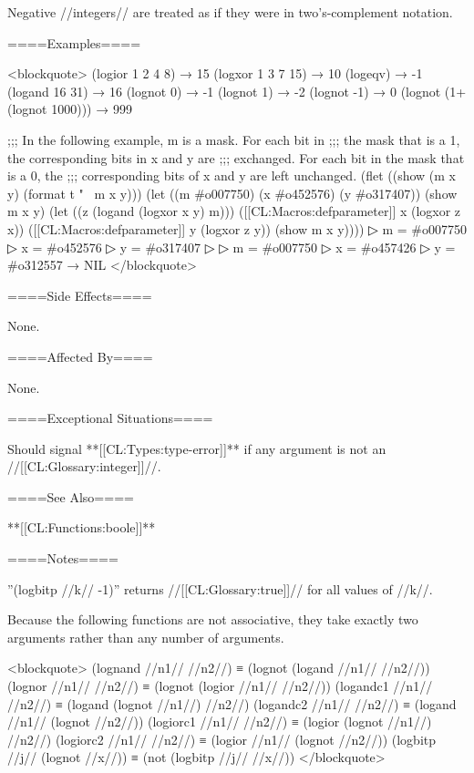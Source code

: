 Negative //integers// are treated as if they were in two's-complement notation.

====Examples====

<blockquote> (logior 1 2 4 8) → 15 (logxor 1 3 7 15) → 10 (logeqv) → -1 (logand 16 31) → 16 (lognot 0) → -1 (lognot 1) → -2 (lognot -1) → 0 (lognot (1+ (lognot 1000))) → 999

;;; In the following example, m is a mask. For each bit in ;;; the mask that is a 1, the corresponding bits in x and y are ;;; exchanged. For each bit in the mask that is a 0, the ;;; corresponding bits of x and y are left unchanged. (flet ((show (m x y) (format t "~ m x y))) (let ((m #o007750) (x #o452576) (y #o317407)) (show m x y) (let ((z (logand (logxor x y) m))) ([[CL:Macros:defparameter]] x (logxor z x)) ([[CL:Macros:defparameter]] y (logxor z y)) (show m x y))))
▷ m = #o007750
▷ x = #o452576
▷ y = #o317407
▷
▷ m = #o007750
▷ x = #o457426
▷ y = #o312557 → NIL </blockquote>

====Side Effects====

None.

====Affected By====

None.

====Exceptional Situations====

Should signal **[[CL:Types:type-error]]** if any argument is not an //[[CL:Glossary:integer]]//.

====See Also====

**[[CL:Functions:boole]]**

====Notes====

''(logbitp //k// -1)'' returns //[[CL:Glossary:true]]// for all values of //k//.

Because the following functions are not associative, they take exactly two arguments rather than any number of arguments.

<blockquote> (lognand //n1// //n2//) ≡ (lognot (logand //n1// //n2//)) (lognor //n1// //n2//) ≡ (lognot (logior //n1// //n2//)) (logandc1 //n1// //n2//) ≡ (logand (lognot //n1//) //n2//) (logandc2 //n1// //n2//) ≡ (logand //n1// (lognot //n2//)) (logiorc1 //n1// //n2//) ≡ (logior (lognot //n1//) //n2//) (logiorc2 //n1// //n2//) ≡ (logior //n1// (lognot //n2//)) (logbitp //j// (lognot //x//)) ≡ (not (logbitp //j// //x//)) </blockquote>

